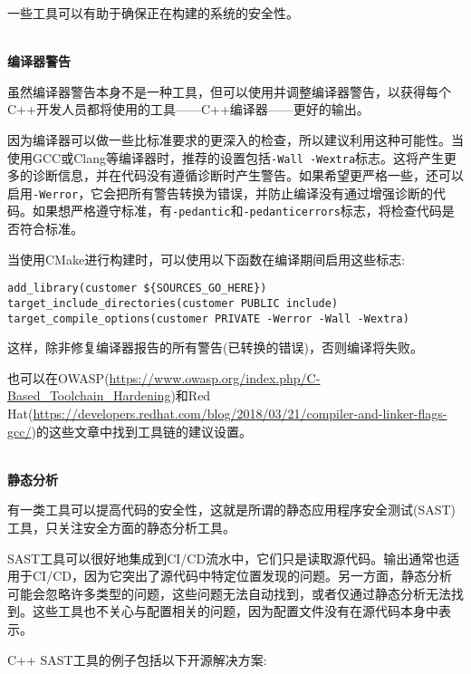一些工具可以有助于确保正在构建的系统的安全性。

\hspace*{\fill} \\ %
\noindent
\textbf{编译器警告}

虽然编译器警告本身不是一种工具，但可以使用并调整编译器警告，以获得每个C++开发人员都将使用的工具——C++编译器——更好的输出。

因为编译器可以做一些比标准要求的更深入的检查，所以建议利用这种可能性。当使用GCC或Clang等编译器时，推荐的设置包括\texttt{-Wall -Wextra}标志。这将产生更多的诊断信息，并在代码没有遵循诊断时产生警告。如果希望更严格一些，还可以启用\texttt{-Werror}，它会把所有警告转换为错误，并防止编译没有通过增强诊断的代码。如果想严格遵守标准，有\texttt{-pedantic}和\texttt{-pedanticerrors}标志，将检查代码是否符合标准。

当使用CMake进行构建时，可以使用以下函数在编译期间启用这些标志:

\begin{lstlisting}[style=styleCMake]
add_library(customer ${SOURCES_GO_HERE})
target_include_directories(customer PUBLIC include)
target_compile_options(customer PRIVATE -Werror -Wall -Wextra)
\end{lstlisting}

这样，除非修复编译器报告的所有警告(已转换的错误)，否则编译将失败。

也可以在OWASP(\url{https://www.owasp.org/index.php/C-Based\_Toolchain\_Hardening})和Red Hat(\url{https://developers.redhat.com/blog/2018/03/21/compiler-and-linker-flags-gcc/})的这些文章中找到工具链的建议设置。

\hspace*{\fill} \\ %
\noindent
\textbf{静态分析}

有一类工具可以提高代码的安全性，这就是所谓的静态应用程序安全测试(SAST)工具，只关注安全方面的静态分析工具。

SAST工具可以很好地集成到CI/CD流水中，它们只是读取源代码。输出通常也适用于CI/CD，因为它突出了源代码中特定位置发现的问题。另一方面，静态分析可能会忽略许多类型的问题，这些问题无法自动找到，或者仅通过静态分析无法找到。这些工具也不关心与配置相关的问题，因为配置文件没有在源代码本身中表示。

C++ SAST工具的例子包括以下开源解决方案:

